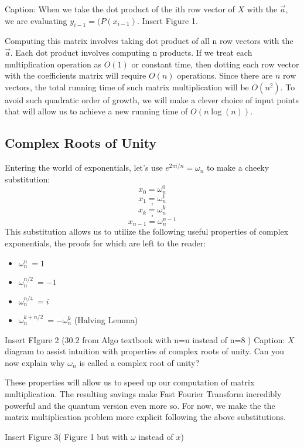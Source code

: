 \documentclass{article}
\newcommand{\om}{\omega_n}
\begin{document}
      Caption: When we take the dot product of the ith row vector of \(X\) with the
      \(\vec{a}\), we are evaluating \(y_{i-1} = (P(x_{i-1})\).
      Insert Figure 1.

      Computing this matrix involves taking dot product of all n row vectors with
      the \(\vec{a}\). Each dot product involves computing n products. If
      we treat each multiplication operation as \(O(1)\) or constant time,
      then dotting each row vector with the coefficients matrix will
      require \(O(n)\) operations. Since there are \(n\) row vectors,
      the
     total running time of such matrix multiplication will be \(O(n^2)\).
      To avoid such quadratic order of growth, we will make a clever choice of
      input points that will allow us to achieve a new running time of
      \(O(n\log(n))\).
    \subsection{Complex Roots of Unity}
      Entering the world of exponentials, let's use \(e^{{2\pi i}/n} = \om\)
      to make a cheeky substitution:
      \[x_0 =\om^0 \]
      \[x_1 =\om^1\]
      \[.\]
      \[.\]
      \[x_k =\om^k\]
      \[.\]
      \[.\]
      \[x_{n-1} = \om^{n-1}\]
      This substitution allows us to utilize the following useful properties
      of complex exponentials, the proofs for which are left to the reader:
      \begin{itemize}
        \item \(\om^{n}\ = 1\)
        \item \(\om^{n/2}\ = -1\)
        \item \(\om^{n/4}\ = i\)
        \item \(\om^{k + n/2}\ = -\om^k\) (Halving Lemma)
      \end{itemize}
      Insert FIgure 2 (30.2 from Algo textbook with n=n instead of n=8 )
      Caption: \(X\) diagram to assist intuition with properties of complex roots of
      unity. Can you now explain why \(\om\) is called a complex root of unity?

      These properties will allow us to speed up our computation of matrix
      multiplication. The resulting savings make Fast Fourier Transform incredibly
      powerful and the quantum version even more so. For now, we make the
      the matrix multiplication problem more explicit following the above
      substitutions.

      Insert Figure 3( Figure 1 but with \(\omega\) instead of \(x\))
\end{document}
